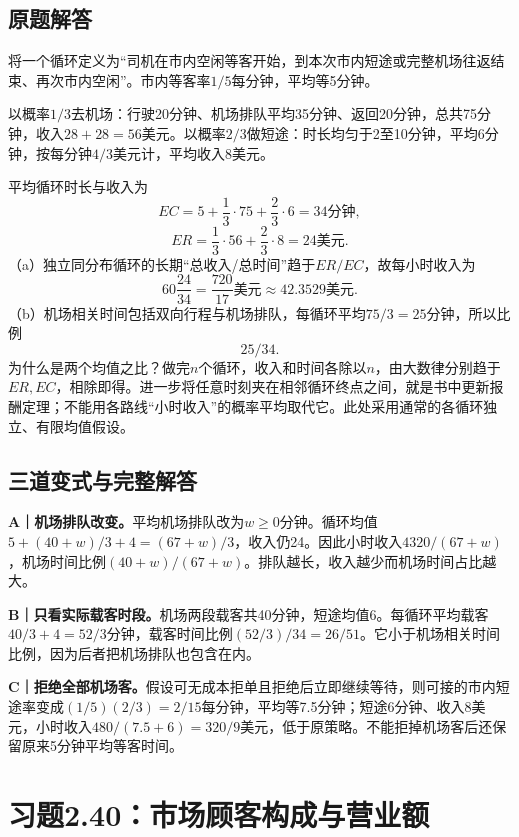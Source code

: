 \documentclass[
  11pt,
  a4paper,
  UTF8,fontset=fandol]{ctexart}
\let\OldSection\section
\renewcommand{\section}{\Needspace{7\baselineskip}\OldSection}
\let\OldSubsection\subsection
\renewcommand{\subsection}{\Needspace{5\baselineskip}\OldSubsection}
\begin{document}
\subsection{原题解答}\label{ux539fux9898ux89e3ux7b54-38}

将一个循环定义为``司机在市内空闲等客开始，到本次市内短途或完整机场往返结束、再次市内空闲''。市内等客率\(1/5\)每分钟，平均等5分钟。

以概率\(1/3\)去机场：行驶20分钟、机场排队平均35分钟、返回20分钟，总共75分钟，收入\(28+28=56\)美元。以概率\(2/3\)做短途：时长均匀于2至10分钟，平均6分钟，按每分钟\(4/3\)美元计，平均收入8美元。

平均循环时长与收入为
\[EC=5+\frac13\cdot75+\frac23\cdot6=34\text{分钟},\]
\[ER=\frac13\cdot56+\frac23\cdot8=24\text{美元}.\]
（a）独立同分布循环的长期``总收入/总时间''趋于\(ER/EC\)，故每小时收入为
\[\boxed{60\frac{24}{34}=\frac{720}{17}\text{美元}\approx42.3529\text{美元}.}\]
（b）机场相关时间包括双向行程与机场排队，每循环平均\(75/3=25\)分钟，所以比例
\[\boxed{25/34}.\]
为什么是两个均值之比？做完\(n\)个循环，收入和时间各除以\(n\)，由大数律分别趋于\(ER,EC\)，相除即得。进一步将任意时刻夹在相邻循环终点之间，就是书中更新报酬定理；不能用各路线``小时收入''的概率平均取代它。此处采用通常的各循环独立、有限均值假设。

\subsection{三道变式与完整解答}\label{ux4e09ux9053ux53d8ux5f0fux4e0eux5b8cux6574ux89e3ux7b54-38}

\textbf{A｜机场排队改变。}平均机场排队改为\(w\ge0\)分钟。循环均值\(5+(40+w)/3+4=(67+w)/3\)，收入仍24。因此小时收入\(4320/(67+w)\)，机场时间比例\((40+w)/(67+w)\)。排队越长，收入越少而机场时间占比越大。

\textbf{B｜只看实际载客时段。}机场两段载客共40分钟，短途均值6。每循环平均载客\(40/3+4=52/3\)分钟，载客时间比例\((52/3)/34=26/51\)。它小于机场相关时间比例，因为后者把机场排队也包含在内。

\textbf{C｜拒绝全部机场客。}假设可无成本拒单且拒绝后立即继续等待，则可接的市内短途率变成\((1/5)(2/3)=2/15\)每分钟，平均等7.5分钟；短途6分钟、收入8美元，小时收入\(480/(7.5+6)=320/9\)美元，低于原策略。不能拒掉机场客后还保留原来5分钟平均等客时间。

\newpage

\section{习题2.40：市场顾客构成与营业额}\label{ux4e60ux98982.40ux5e02ux573aux987eux5ba2ux6784ux6210ux4e0eux8425ux4e1aux989d}
\end{document}
